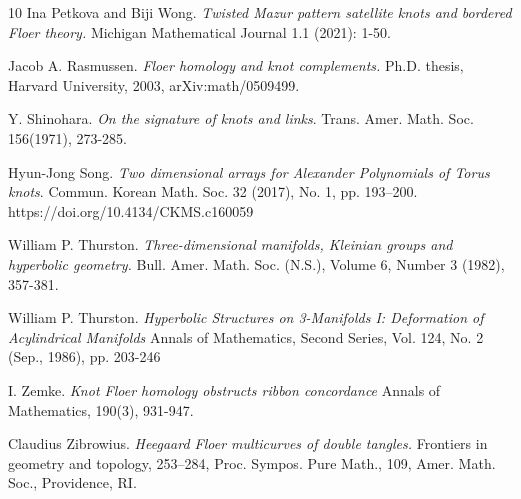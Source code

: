 \documentclass[11pt,reqno]{amsart}
\theoremstyle{definition}
\newtheorem *{remark}{Remark}
\begin{document}
\begin{thebibliography}{10}
Ina Petkova and Biji Wong.
\textit{Twisted Mazur pattern satellite knots and bordered Floer theory.}
Michigan Mathematical Journal 1.1 (2021): 1-50.

Jacob A. Rasmussen.
\textit{Floer homology and knot complements.}
Ph.D. thesis, Harvard University, 2003, arXiv:math/0509499.

Y. Shinohara.
\textit{On the signature of knots and links}.
Trans. Amer. Math. Soc. 156(1971), 273-285. 

Hyun-Jong Song.
\textit{Two dimensional arrays for Alexander Polynomials of Torus knots}.
Commun. Korean Math. Soc. 32 (2017), No. 1, pp. 193–200.
https://doi.org/10.4134/CKMS.c160059


 William P. Thurston.
 \textit{Three-dimensional manifolds, Kleinian groups and hyperbolic geometry.} Bull. Amer. Math. Soc. (N.S.), Volume 6, Number 3 (1982), 357-381.
 
William P. Thurston.
\textit{Hyperbolic Structures on 3-Manifolds I: Deformation of Acylindrical Manifolds}
Annals of Mathematics, Second Series, Vol. 124, No. 2 (Sep., 1986), pp. 203-246


I. Zemke.
\textit{Knot Floer homology obstructs ribbon concordance}
Annals of Mathematics, 190(3), 931-947.

Claudius Zibrowius.
\textit{Heegaard Floer multicurves of double tangles.}
Frontiers in geometry and topology, 253--284, Proc. Sympos. Pure Math., 109, Amer. Math. Soc., Providence, RI.  

\end{thebibliography}
\end{document}
